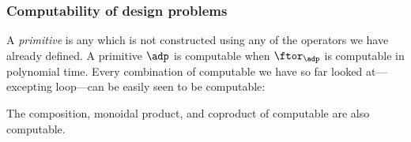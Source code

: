 \subsubsection{Computability of  design problems}

A \emph{primitive}  is any  which is not constructed using any of the operators we have already defined.
A primitive  $\adp$ is computable when $\ftor_\adp$ is computable in polynomial time.
Every combination of computable  we have so far looked at---excepting loop---can be easily seen to be computable:

\begin{proposition}
    The composition, monoidal product, and coproduct of computable  are also computable.
\end{proposition}

